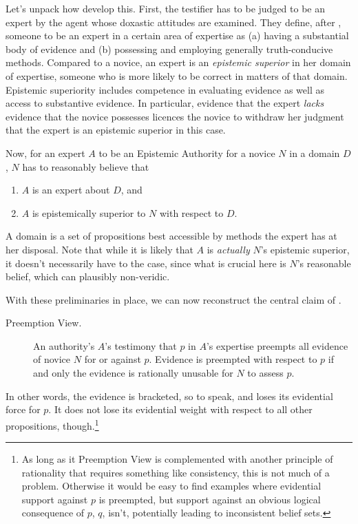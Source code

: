 \documentclass[11pt, a4paper]{scrartcl}
\renewcommand{\i}[1]{\emph{#1}}
\renewcommand{\b}[1]{{\osfamily{}#1}}
\begin{document}
Let's unpack how \textcite{Constantin2017} develop this. First, the testifier has to be judged to be an expert by the agent whose doxastic attitudes are examined. They define, after \textcite{Goldman2001}, someone to be an expert in a certain area of expertise as (a) having a substantial body of evidence and (b) possessing and employing generally truth-conducive methods. Compared to a novice, an expert is an \i{epistemic superior} in her domain of expertise, someone who is more likely to be correct in matters of that domain. Epistemic superiority includes competence in evaluating evidence as well as access to substantive evidence. In particular, evidence that the expert \i{lacks} evidence that the novice possesses licences the novice to withdraw her judgment that the expert is an epistemic superior in this case. 

Now, for an expert $A$ to be an \b{Epistemic Authority} for a novice $N$ in a domain $D$, $N$ has to reasonably believe that 
\begin{enumerate}[label = (\roman*)]
    \item $A$ is an expert about $D$, and
    \item $A$ is epistemically superior to $N$ with respect to $D$.
\end{enumerate}
A domain is a set of propositions best accessible by methods the expert has at her disposal. Note that while it is likely that $A$ is \i{actually} $N$'s epistemic superior, it doesn't necessarily have to the case, since what is crucial here is $N$'s reasonable belief, which can plausibly non-veridic. 

With these preliminaries in place, we can now reconstruct the central claim of \textcite{Constantin2017}. 
\begin{description}
    \item[Preemption View.] An authority's $A$'s testimony that $p$ in $A$'s expertise preempts all evidence of novice $N$ for or against $p$. Evidence is preempted with respect to $p$ if and only the evidence is rationally unusable for $N$ to assess $p$. 
\end{description}

In other words, the evidence is bracketed, so to speak, and loses its evidential force for $p$. It does not lose its evidential weight with respect to all other propositions, though.\footnote{As long as it Preemption View is complemented with another principle of rationality that requires something like consistency, this is not much of a problem. Otherwise it would be easy to find examples where evidential support against $p$ is preempted, but support against an obvious logical consequence of $p$, $q$, isn't, potentially leading to inconsistent belief sets.} 
\end{document}

